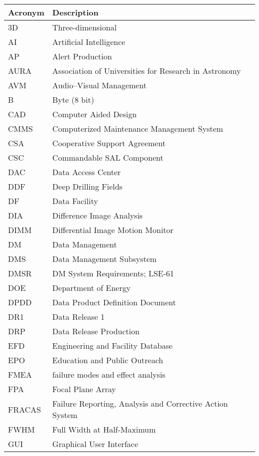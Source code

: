 \addtocounter{table}{-1}
\begin{longtable}{p{}p{}}\hline
\textbf{Acronym} & \textbf{Description}  \\\hline

3D & Three-dimensional \\\hline
AI & Artificial Intelligence \\\hline
AP & Alert Production \\\hline
AURA & Association of Universities for Research in Astronomy \\\hline
AVM & Audio--Visual Management \\\hline
B & Byte (8 bit) \\\hline
CAD & Computer Aided Design \\\hline
CMMS & Computerized Maintenance Management System \\\hline
CSA & Cooperative Support Agreement \\\hline
CSC & Commandable SAL Component \\\hline
DAC & Data Access Center \\\hline
DDF & Deep Drilling Fields \\\hline
DF & Data Facility \\\hline
DIA & Difference Image Analysis \\\hline
DIMM & Differential Image Motion Monitor \\\hline
DM & Data Management \\\hline
DMS & Data Management Subsystem \\\hline
DMSR & DM System Requirements; LSE-61 \\\hline
DOE & Department of Energy \\\hline
DPDD & Data Product Definition Document \\\hline
DR1 & Data Release 1 \\\hline
DRP & Data Release Production \\\hline
EFD & Engineering and Facility Database \\\hline
EPO & Education and Public Outreach \\\hline
FMEA & failure modes and effect analysis \\\hline
FPA & Focal Plane Array \\\hline
FRACAS & Failure Reporting, Analysis and Corrective Action System \\\hline
FWHM & Full Width at Half-Maximum \\\hline
GUI & Graphical User Interface \\\hline

\end{longtable}
